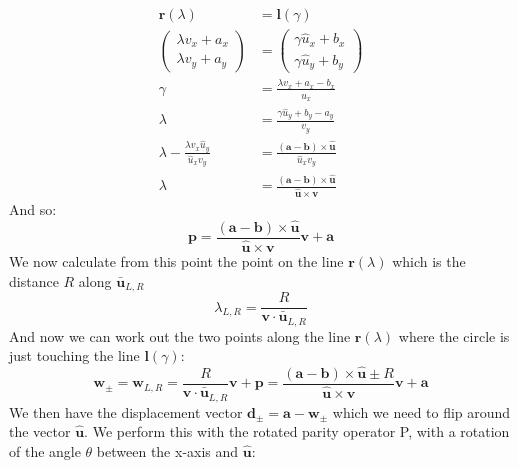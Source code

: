 \documentclass[12pt]{article}
\begin{document}
\begin{equation}
	\begin{split}
		\mathbf{r}(\lambda) &= \mathbf{l}(\gamma) \\
		\left(\begin{matrix}\lambda v_x+a_x \\ \lambda v_y+a_y\end{matrix}\right) &= 
		\left(\begin{matrix}\gamma \hat u_x+b_x \\ \gamma \hat u_y+b_y\end{matrix}\right)
		\\
		\gamma&= \frac{\lambda v_x + a_x - b_x}{\hat u_x}\\
		\lambda&= \frac{\gamma \hat u_y + b_y - a_y}{v_y}\\
		\lambda - \frac{\lambda v_x \hat u_y}{\hat u_x v_y} &= \frac{(\mathbf{a}-\mathbf{b})\times \mathbf{ \hat u}}{\hat u_xv_y}\\
		\lambda &= \frac{(\mathbf{a}-\mathbf{b})\times \mathbf{ \hat u}}{\mathbf{\hat u} \times \mathbf{v}}
	\end{split}
\end{equation}
And so: 
\begin{equation}
	\mathbf p = \frac{(\mathbf{a}-\mathbf{b})\times \mathbf{ \hat u}}{\mathbf{\hat u} \times \mathbf{v}} \mathbf{v} + \mathbf{a}
\end{equation}
We now calculate from this point the point on the line $\mathbf r(\lambda)$ which is the distance $R$ along $\mathbf{\bar u}_{L,R}$
\begin{equation}
\lambda_{ L, R} = \frac{R}{\mathbf v \cdot \mathbf{\bar u}_{L,R}}
\end{equation}
And now we can work out the two points along the line $\mathbf r(\lambda)$ where the circle is just touching the line $\mathbf l(\gamma)$:
\begin{equation}
\mathbf{w}_{\pm}=\mathbf{w}_{L,R} = \frac{R}{\mathbf v \cdot \mathbf{\bar u}_{L,R}} \mathbf v + \mathbf p = \frac{(\mathbf a - \mathbf b) \times \mathbf{\hat u}\pm R}{\mathbf{\hat u}\times \mathbf{v}} \mathbf v + \mathbf a
\end{equation}
We then have the displacement vector $\mathbf d_{\pm} = \mathbf a - \mathbf w_{\pm}$ which we need to flip around the vector $\mathbf {\hat u}$. We perform this with the rotated parity operator P, with a rotation of the angle $\theta$ between the x-axis and $\mathbf {\hat u}$:
\end{document}
